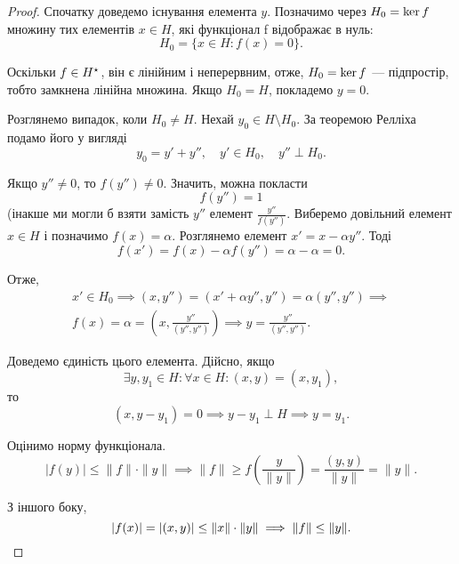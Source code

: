 \begin{proof}
Спочатку доведемо існування елемента $y$.
Позначимо через $H_0 = \operatorname{ker} f$ множину тих елементів
$x \in H$, які функціонал f відображає в нуль:
\begin{equation*}
    H_0 = \{x \in H: f(x) = 0\}.
\end{equation*}

Оскільки
$f \in H^\star$, він є лінійним і неперервним, отже,
$H_0 = \operatorname{ker} f$ --- підпростір, тобто замкнена лінійна
множина. Якщо $H_0 = H$, покладемо $y = 0$.

Розглянемо випадок, коли $H_0 \ne H$. Нехай $y_0 \in H \setminus H_0$.
За теоремою Релліха подамо його у вигляді
\begin{equation*}
    y_0 = y' + y'', \quad y' \in H_0, \quad y'' \perp H_0.
\end{equation*}

Якщо $y'' \ne 0$, то $f(y'') \ne 0$. Значить, можна покласти
\begin{equation*}
    f(y'') = 1
\end{equation*}
(інакше ми могли б взяти замість $y''$ елемент $\frac{y''}{f(y'')}$.
Виберемо довільний елемент $x \in H$ і позначимо
$f(x) = \alpha$. Розглянемо елемент $x' = x - \alpha y''$. Тоді
\begin{equation*}
    f(x') = f(x) - \alpha f(y'') = \alpha - \alpha = 0.    
\end{equation*}

Отже,
\begin{multline*}
    x' \in H_0 \implies (x, y'') = (x' + \alpha y'', y'') = \alpha (y'', y'') \implies \\
    f(x) = \alpha = \left( x, \frac{y''}{(y'', y'')} \right) \implies y = \frac{y''}{(y'', y'')}.
\end{multline*}

Доведемо єдиність цього елемента. Дійсно, якщо
\begin{equation*}
    \exists y, y_1 \in H: \forall x \in H: (x, y) = (x, y_1),
\end{equation*}
то
\begin{equation*}
    (x, y - y_1) = 0 \implies y - y_1 \perp H \implies y = y_1.
\end{equation*}

Оцінимо норму функціонала.
\begin{equation*}
    |f(y)| \le \|f\| \cdot \|y\| \implies
    \|f\| \ge f \left( \frac{y}{\|y\|} \right) = \frac{(y, y)}{\|y\|} = \|y\|.
\end{equation*}

З іншого боку,
\begin{equation*}
    |f(x)| = |(x, y)| \le \|x\| \cdot \|y\| \implies
    \|f\| \le \|y\|. \qedhere
\end{equation*}
\end{proof}

